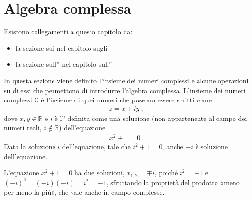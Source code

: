 \documentclass[letterpaper,10pt,italian]{jupyterBook}
\begin{document}
\sphinxstepscope




\chapter{Algebra complessa}
\label{\detokenize{ch/algebra/complex-algebra:algebra-complessa}}\label{\detokenize{ch/algebra/complex-algebra:math-hs-algebra-complex}}\label{\detokenize{ch/algebra/complex-algebra::doc}}
\sphinxAtStartPar
Esistono collegamenti a questo capitolo da:
\begin{itemize}
\item {} 
\sphinxAtStartPar
la sezione sui {\hyperref[\detokenize{ch/set/numeric-sets:sets-numeric-c}]{}} nel capitolo sugli {\hyperref[\detokenize{ch/set/numeric-sets:sets-numeric}]{}}

\item {} 
\sphinxAtStartPar
la sezione sull”{\hyperref[\detokenize{ch/algebra/complex-algebra-link:math-hs-algebra-complex-link}]{}} nel capitolo sull”{\hyperref[\detokenize{ch/algebra:math-hs-algebra}]{}}

\end{itemize}

\sphinxAtStartPar
In questa sezione viene definito l’insieme dei numeri complessi e alcune operazioni su di essi che permettono di introdurre l’algebra complessa. L’insieme dei numeri complessi \(\mathbb{C}\) è l’insieme di quei numeri che possono essere scritti come
\begin{equation*}
\begin{split}z = x + i y \ ,\end{split}
\end{equation*}
\sphinxAtStartPar
dove \(x, y \in \mathbb{R}\) e \(i\) è l” definita come una soluzione (non appartenente al campo dei numeri reali, \(i \notin \mathbb{R}\)) dell’equazione
\begin{equation*}
\begin{split}x^2 + 1 = 0 \ .\end{split}
\end{equation*}
\sphinxAtStartPar
Data la soluzione \(i\) dell’equazione, tale che \(i^2 + 1 = 0\), anche \(-i\) è soluzione dell’equazione.%
\begin{footnote}[1]\sphinxAtStartFootnote
L’equazione \(x^2 + 1 = 0\) ha due soluzioni, \(x_{1,2} = \mp i\), poiché \(i^2 = -1\) e \((-i)^2 = (-i) (-i) = i^2 = -1\), sfruttando la proprietà del prodotto «meno per meno fa più», che vale anche in campo complesso.
%
\end{footnote}
\end{document}
